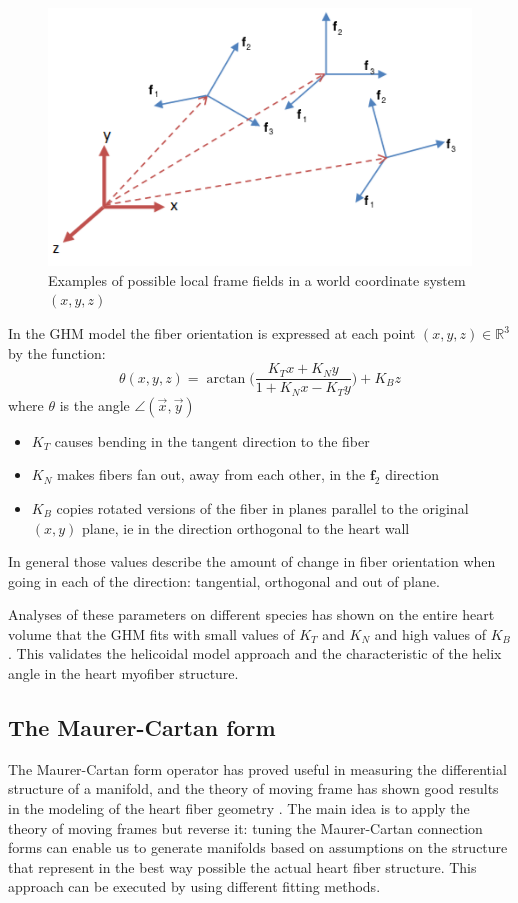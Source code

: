 \begin{figure}
    \centering
    \includegraphics[width=.5\textwidth]{figures/frame_fields}
    \caption{Examples of possible local frame fields in a world coordinate system $(x, y, z)$}
    \label{fig:frame_fields}
\end{figure}

In the GHM model the fiber orientation is expressed at each point $(x, y, z) \in \mathbb{R}^3$ by the function:
\begin{equation}
\theta (x, y, z) = \arctan \Bigg( \frac{K_Tx + K_Ny}{1 + K_Nx - K_Ty} \Bigg) + K_Bz
\end{equation}
where $\theta$ is the angle $\angle (\overrightarrow{x}, \overrightarrow{y})$
\begin{itemize}
    \item $K_T$ causes bending in the tangent direction to the fiber
    \item $K_N$ makes fibers fan out, away from each other, in the $\mathbf{f}_2$ direction
    \item $K_B$ copies rotated versions of the fiber in planes parallel to the original $(x, y)$ plane, ie in the direction orthogonal to the heart wall
\end{itemize}
In general those values describe the amount of change in fiber orientation when going in each of the direction: tangential, orthogonal and out of plane.

Analyses of these parameters on different species has shown on the entire heart volume \cite{savadjiev2012heart} that the GHM fits with small values of $K_T$ and $K_N$ and high values of $K_B$. This validates the helicoidal model approach and the characteristic of the helix angle in the heart myofiber structure.

\subsection{The Maurer-Cartan form}

The Maurer-Cartan form operator has proved useful in measuring the differential structure of a manifold, and the theory of moving frame has shown good results in the modeling of the heart fiber geometry \cite{pami2015}. The main idea is to apply the theory of moving frames but reverse it: tuning the Maurer-Cartan connection forms can enable us to generate manifolds based on assumptions on the structure that represent in the best way possible the actual heart fiber structure. This approach can be executed by using different fitting methods.

